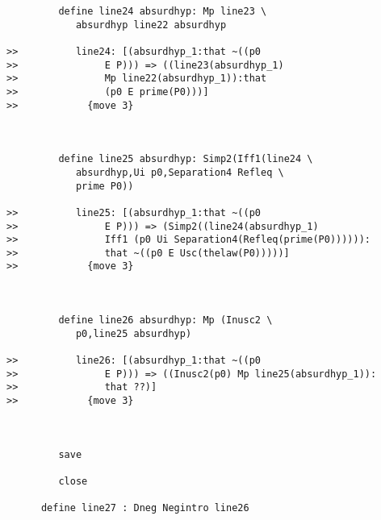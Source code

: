 \documentclass[12pt]{article}
\begin{document}
\begin{verbatim}
         define line24 absurdhyp: Mp line23 \
            absurdhyp line22 absurdhyp

>>          line24: [(absurdhyp_1:that ~((p0
>>               E P))) => ((line23(absurdhyp_1)
>>               Mp line22(absurdhyp_1)):that
>>               (p0 E prime(P0)))]
>>            {move 3}



         define line25 absurdhyp: Simp2(Iff1(line24 \
            absurdhyp,Ui p0,Separation4 Refleq \
            prime P0))

>>          line25: [(absurdhyp_1:that ~((p0
>>               E P))) => (Simp2((line24(absurdhyp_1)
>>               Iff1 (p0 Ui Separation4(Refleq(prime(P0)))))):
>>               that ~((p0 E Usc(thelaw(P0)))))]
>>            {move 3}



         define line26 absurdhyp: Mp (Inusc2 \
            p0,line25 absurdhyp)

>>          line26: [(absurdhyp_1:that ~((p0
>>               E P))) => ((Inusc2(p0) Mp line25(absurdhyp_1)):
>>               that ??)]
>>            {move 3}



         save

         close

      define line27 : Dneg Negintro line26



\end{verbatim}
\end{document}
